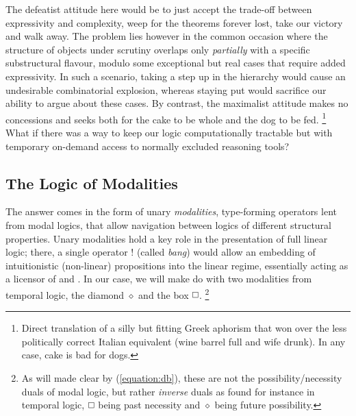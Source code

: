 The defeatist attitude here would be to just accept the trade-off between expressivity and complexity, weep for the theorems forever lost, take our victory and walk away.
The problem lies however in the common occasion where the structure of objects under scrutiny overlaps only \textit{partially} with a specific substructural flavour, modulo some exceptional but real cases that require added expressivity.
In such a scenario, taking a step up in the hierarchy would cause an undesirable combinatorial explosion, whereas staying put would sacrifice our ability to argue about these  cases. 
By contrast, the maximalist attitude makes no concessions and seeks both for the cake to be whole and the dog to be fed.%
\footnote{Direct translation of a silly but fitting Greek aphorism that won over the less politically correct Italian equivalent (wine barrel full and wife drunk). In any case, cake is bad for dogs.}
What if there was a way to keep our logic computationally tractable but with temporary on-demand access to normally excluded reasoning tools?

\subsection{The Logic of Modalities}\label{subsec:modal_logic}
The answer comes in the form of unary \textit{modalities}, type-forming operators lent from modal logics, that allow navigation between logics of different structural properties.
Unary modalities hold a key role in the presentation of full linear logic; there, a single operator $!$ (called \textit{bang}) would allow an embedding of intuitionistic (non-linear) propositions into the linear regime, essentially acting as a licensor of \Contraction{} and \Weakening{}.
In our case, we will make do with two modalities from temporal logic, the diamond $\diamond$ and the box $\bx$.%
	\footnote{As will made clear by (\ref{equation:db}), these are not the possibility/necessity duals of modal logic, but rather \textit{inverse} duals as found for instance in temporal logic, $\bx$ being past necessity and $\diamond$ being future possibility.}

